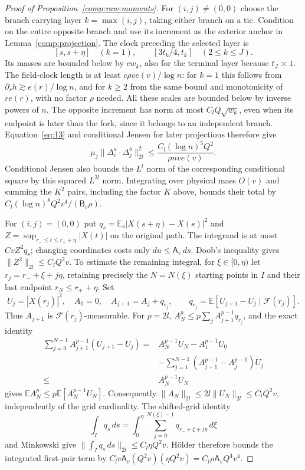 \begin{proof}[Proof of Proposition~\ref{comp:raw-moments}]
For $(i,j)\ne(0,0)$ choose the branch carrying layer
$k=\max(i,j)$, taking either branch on a tie.  Condition on the entire
opposite branch and use its increment as the exterior anchor in
Lemma~\ref{comp:projection}.  The clock preceding the selected layer is
\[
 [s,s+\eta]\quad(k=1),\qquad
 [3t_k/4,t_k]\quad(2\le k\le J).
\]
Its masses are bounded below by $cw_k$, also for the terminal layer
because $t_J\asymp1$.  The field-clock length is at least
$c\rho ve(v)/\log n$: for $k=1$ this follows from
$\partial_r h\gtrsim e(r)/\log n$, and for $k\ge2$ from the same bound and
monotonicity of $re(r)$, with no factor $\rho$ needed.
All these scales are bounded below by inverse powers of $n$.
The opposite increment has norm at most $C_lQ\sqrt{w_k}$, even when
its endpoint is later than the fork, since it belongs to an independent
branch.  Equation~\eqref{eq:13} and conditional Jensen for later
projections therefore give
\[
 \mu_j\|\Delta_i^a\cdot\Delta_j^b\|_{2l}^2
 \le \frac{C_l(\log n)^5Q^2}{\rho nve(v)}.
\]
Conditional Jensen also bounds the $L^l$ norm of the corresponding
conditional square by this squared $L^{2l}$ norm.  Integrating over
physical mass $O(v)$ and summing the $K^2$ pairs, including the factor
$K$ above, bounds their total by
$C_l(\log n)^8Q^2v^4/(\mathsf B_v\rho)$.

For $(i,j)=(0,0)$ put
$q_s=\mathbb E_s|X(s+\eta)-X(s)|^2$ and
$Z=\sup_{r_-\le t\le r_++\eta}|X(t)|$ on the original path.
The integrand is at most $CvZ^2q_s$; changing coordinates costs only
$du\le \mathsf A_v\,ds$.  Doob's inequality gives
$\|Z^2\|_{2l}\le C_lQ^2v$.  To estimate the remaining integral, for
$\xi\in[0,\eta)$ let $r_j=r_-+\xi+j\eta$, retaining precisely the
$N=N(\xi)$ starting points in $I$ and their last endpoint
$r_N\le r_++\eta$.  Set
\[
 U_j=|X(r_j)|^2,\quad A_0=0,\quad
 A_{j+1}=A_j+q_{r_j},\qquad
 q_{r_j}=\mathbb E[U_{j+1}-U_j\mid\mathcal F(r_j)].
\]
Thus $A_{j+1}$ is $\mathcal F(r_j)$-measurable.  For $p=2l$,
$A_N^p\le p\sum_jA_{j+1}^{p-1}q_{r_j}$, and the exact identity
\[
 \begin{split}
 \sum_{j=0}^{N-1}A_{j+1}^{p-1}(U_{j+1}-U_j)
 ={}&A_N^{p-1}U_N-A_1^{p-1}U_0\\
 &-\sum_{j=1}^{N-1}(A_{j+1}^{p-1}-A_j^{p-1})U_j\\
 \le{}&A_N^{p-1}U_N
 \end{split}
\]
gives $\mathbb E A_N^p\le p\mathbb E[A_N^{p-1}U_N]$.
Consequently $\|A_N\|_{2l}\le2l\|U_N\|_{2l}\le C_lQ^2v$,
independently of the grid cardinality.  The shifted-grid identity
\[
 \int_Iq_s\,ds
   =\int_0^\eta\sum_{j=0}^{N(\xi)-1}q_{r_-+\xi+j\eta}\,d\xi
\]
and Minkowski give $\|\int_Iq_s\,ds\|_{2l}\le C_l\eta Q^2v$.
H\"older therefore bounds the integrated first-pair term by
$C_lv\mathsf A_v(Q^2v)(\eta Q^2v)=C_l\rho \mathsf A_vQ^4v^4$.


\end{proof}
